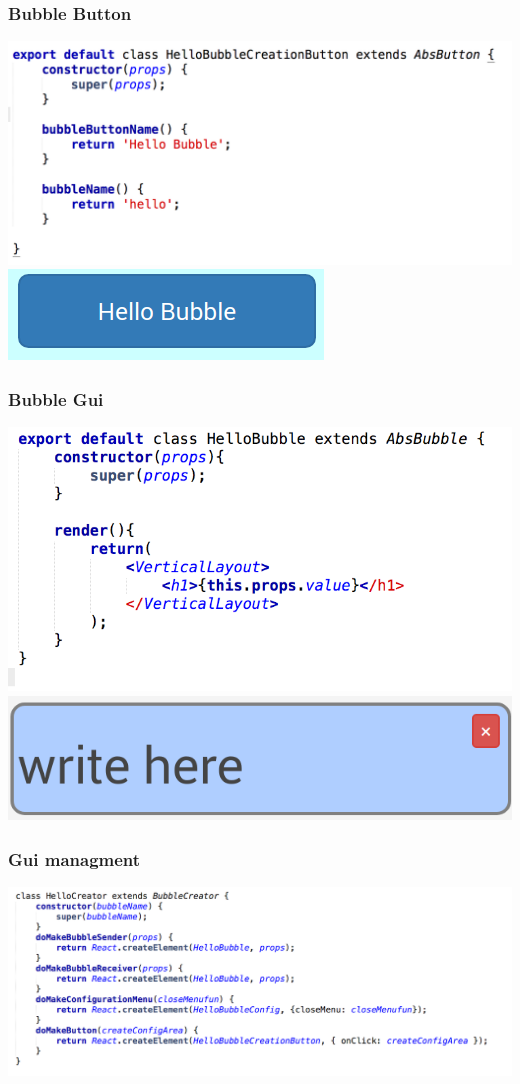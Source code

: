\begin{frame}
	\frametitle{Bubble Button}
	\begin{center}
	\includegraphics[width=.8\textwidth]{code/hellobubblecreationbutton.png}
	\includegraphics[width=.3\textwidth]{code/button.png}
	\end{center}
\end{frame}

\begin{frame}
	\frametitle{Bubble Gui}
	\begin{center}
	\includegraphics[width=.8\textwidth]{code/hellobubble.png}
	\includegraphics[width=.3\textwidth]{code/bubble.png}
	\end{center}
\end{frame}


\begin{frame}
	\frametitle{Gui managment}
	\begin{center}
	\includegraphics[width=.9\textwidth]{code/hellocreator.png}
	\end{center}
\end{frame}


